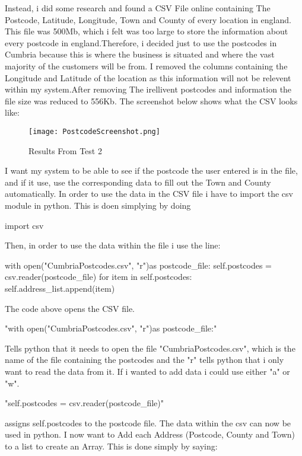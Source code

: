  Instead, i did some research and found a CSV File online containing The Postcode, Latitude, Longitude, Town and County of every location in england. This file was 500Mb, which i felt was too large to store the information about every postcode in england.Therefore, i decided just to use the postcodes in Cumbria because this is where the business is situated and where the vast majority of the customers will be from. I removed the columns containing the Longitude and Latitude of the location as this information will not be relevent within my system.After removing The irellivent postcodes and information the file size was reduced to 556Kb. The screenshot below shows what the CSV looks like:

\begin{figure}[H]
\caption{Results From Test 2} \label{fig:Results From Test 2}
\hfill\texttt{[image: PostcodeScreenshot.png]}\hspace*{\fill}
\end{figure}

I want my system to be able to see if the postcode the user entered is in the file, and if it use, use the corresponding data to fill out the Town and County automatically. In order to use the data in the CSV file i have to import the csv module in python. This is doen simplying by doing \begin{python} import csv \end{python} Then, in order to use the data within the file i use the line:

\begin{python}
with open("CumbriaPostcodes.csv", "r")as postcode_file:
                        self.postcodes = csv.reader(postcode_file)
                        for item in self.postcodes:
                                self.address_list.append(item)
\end{python}

The code above opens the CSV file.  \begin{python} "with open("CumbriaPostcodes.csv", "r")as postcode_file:"\end{python} Tells python that it needs to open the file "CumbriaPostcodes.csv", which is the name of the file containing the postcodes and the "r" tells python that i only want to read the data from it. If i wanted to add data i could use either "a" or "w".  \begin{python} "self.postcodes = csv.reader(postcode_file)"  \end{python} assigns self.postcodes to the postcode file. The data within the csv can now be used in python. I now want to Add each Address (Postcode, County and Town) to a list to create an Array. This is done simply by saying:

